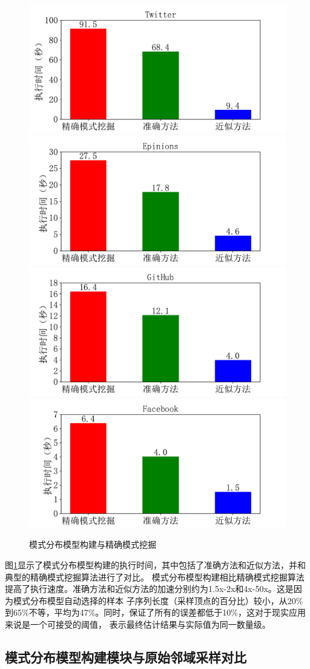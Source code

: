 \documentclass[master]{thesis-uestc}
\begin{document}
\begin{figure}
    \includegraphics[width=0.5\linewidth]{pic/fit-cmp-accurate/Twitter.pdf}%
    \includegraphics[width=0.5\linewidth]{pic/fit-cmp-accurate/Epinions.pdf}\\
    \includegraphics[width=0.5\linewidth]{pic/fit-cmp-accurate/GitHub.pdf}%
    \includegraphics[width=0.5\linewidth]{pic/fit-cmp-accurate/Facebook.pdf}
    \caption{模式分布模型构建与精确模式挖掘}
    \label{fig:fit-cmp-accurate}
\end{figure}
    图\ref{fig:fit-cmp-accurate}显示了模式分布模型构建的执行时间，其中包括了准确方法和近似方法，并和典型的精确模式挖掘算法进行了对比。
模式分布模型构建相比精确模式挖掘算法提高了执行速度。准确方法和近似方法的加速分别约为1.5x-2x和4x-50x。这是因为模式分布模型自动选择的样本
子序列长度（采样顶点的百分比）较小，从20\%到65\%不等，平均为47\%。同时，保证了所有的误差都低于10\%，这对于现实应用来说是一个可接受的阈值，
表示最终估计结果与实际值为同一数量级。


\subsection{模式分布模型构建模块与原始邻域采样对比}
\label{subsec:fitting-cmp-asap}
\end{document}
